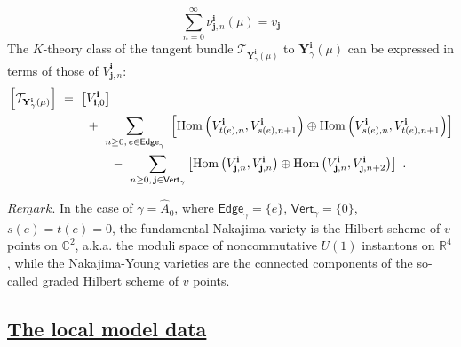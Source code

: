 \documentclass[12pt]{amsart}
\newcommand {\3}{\underline{\bf 3}}
\newcommand {\4}{\underline{\bf 4}}
\newcommand {\6}{\underline{\bf 6}}
\newcommand{\beq}{\begin{equation}}
\newcommand{\eeq}{\end{equation}}
\newcommand {\BC}   {\mathbb C}
\newcommand {\BR}   {\mathbb R}
\newcommand {\bY}   {\mathbf{Y}}
\newcommand {\ib} {\mathbf{i}}
\newcommand {\jb} {\mathbf{j}}
\newcommand {\CalT} {\mathcal T}
\renewcommand{\hat}{\widehat}
\newcommand{\Vg}{\mathsf{Vert}_{\gamma}}
\newcommand{\Eg}{\mathsf{Edge}_{\gamma}}
\newcommand{\subsec}[1]{\subsection{\underline{\bf #1}}}
\begin{document}
\beq
\sum_{n=0}^{\infty} {\nu}_{\jb, n}^{\ib} ({\mu})  = v_{\jb}
\eeq
The $K$-theory class of the tangent bundle ${\CalT}_{{\bY}_{\gamma}^{\ib} ({\mu})}$ to ${\bY}_{\gamma}^{\ib} ({\mu})$ can be expressed in terms of those of $V_{\jb, n}^{\ib}$:
\beq
\begin{aligned}
& \left[ {\CalT}_{{\bY}_{\gamma}^{\ib} ({\mu})} \right] \ = \ \left[  V_{\ib , 0}^{\ib} \right]  \\
& \qquad\qquad\qquad\ +\ \sum\limits_{n \geq 0, \, e \in \Eg} \  \left[  {\rm Hom}\left( V_{t(e),n}^{\ib} , V_{s(e),n+1}^{\ib} \right) \oplus {\rm Hom}\left( V_{s(e),n}^{\ib} , V_{t(e),n+1}^{\ib} \right) \right]  \\
& \qquad\qquad\qquad\qquad\ -\  \sum\limits_{n \geq 0, \, {\jb} \in \Vg}  \left[  {\rm Hom}\left( V_{{\jb},n}^{\ib} , V_{{\jb},n}^{\ib} \right) \oplus {\rm Hom}\left( V_{{\jb},n}^{\ib} , V_{{\jb},n+2}^{\ib} \right)\right] \  .\\
\end{aligned}
\label{eq:tny}
\eeq


{}$\underline{Remark}.$ In the case of $\gamma = {\hat A}_{0}$, where $\Eg = \{ e \}$, $\Vg = \{ 0 \}$, $s(e) = t(e) = 0$, the fundamental Nakajima variety is the Hilbert scheme of $v$ points on ${\BC}^{2}$, a.k.a. the moduli space of noncommutative $U(1)$ instantons on ${\BR}^{4}$, while the Nakajima-Young varieties are the connected components of the so-called graded Hilbert scheme of $v$ points.  

\subsec{The local model data}
\end{document}
